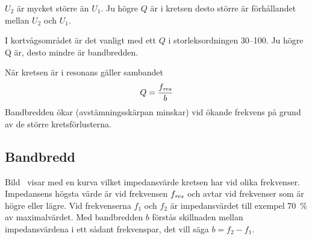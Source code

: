 \(U_2\) är mycket större än \(U_1\).
Ju högre \(Q\) är i kretsen desto större är förhållandet mellan \(U_2\) och
\(U_1\).

I kortvågsområdet är det vanligt med ett \(Q\) i storleksordningen 30--100.
Ju högre Q är, desto mindre är bandbredden.

När kretsen är i resonans gäller sambandet
%
\[Q = \frac{f_{\it res}}{b}\]
%
Bandbredden ökar (avstämningsskärpan minskar) vid ökande frekvens på grund av de
större kretsförlusterna.


\subsection{Bandbredd}

Bild~ visar med en kurva vilket impedansvärde kretsen har
vid olika frekvenser.
Impedansens högsta värde är vid frekvensen \(f_{\it res}\) och avtar vid
frekvenser som är högre eller lägre.
Vid frekvenserna \(f_1\) och \(f_2\) är impedansvärdet till exempel
\qty{70}{\percent} av maximalvärdet.
Med bandbredden \(b\) förstås skillnaden mellan impedansvärdena i ett sådant
frekvenspar, det vill säga \(b = f_2 - f_1\).
